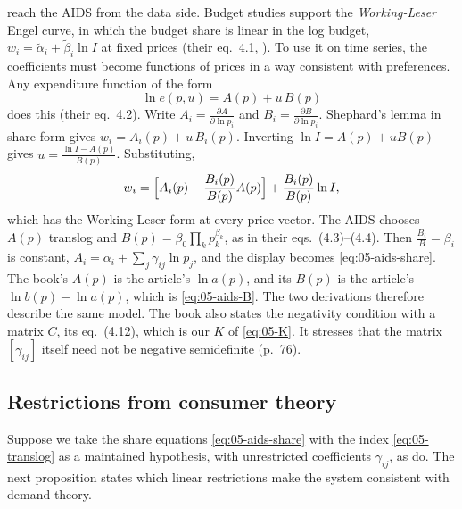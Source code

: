 \begin{remark}\label{rem:05-working-leser}
\citet[\S 3.4, pp.~75--77]{DeatonMuellbauer1980b} reach the AIDS from the data side. Budget studies
support the \emph{Working-Leser} Engel curve, in which the budget share is linear in the log budget, $w_i
= \tilde\alpha_i + \tilde\beta_i\ln I$ at fixed prices (their eq.~4.1, \citealp{Working1943,Leser1963}). To
use it on time series, the coefficients must become functions of prices in a way consistent with
preferences. Any expenditure function of the form
\begin{equation*}
  \ln e(p, u) = A(p) + u\,B(p)
\end{equation*}
does this (their eq.~4.2). Write $A_i = \frac{\partial A}{\partial\ln p_i}$ and $B_i = \frac{\partial
B}{\partial\ln p_i}$. Shephard's lemma in share form gives $w_i = A_i(p) + u\,B_i(p)$. Inverting $\ln I =
A(p) + uB(p)$ gives $u = \frac{\ln I - A(p)}{B(p)}$. Substituting,
\begin{equation*}
  w_i = \Bigl[A_i(p) - \frac{B_i(p)}{B(p)}A(p)\Bigr] + \frac{B_i(p)}{B(p)}\ln I ,
\end{equation*}
which has the Working-Leser form at every price vector. The AIDS chooses $A(p)$ translog and $B(p) =
\beta_0\prod_k p_k^{\beta_k}$, as in their eqs.~(4.3)--(4.4). Then $\frac{B_i}{B} = \beta_i$ is constant,
$A_i = \alpha_i + \sum_j\gamma_{ij}\ln p_j$, and the display becomes \eqref{eq:05-aids-share}. The book's
$A(p)$ is the article's $\ln a(p)$, and its $B(p)$ is the article's $\ln b(p) - \ln a(p)$, which is
\eqref{eq:05-aids-B}. The two derivations therefore describe the same model. The book also states the
negativity condition with a matrix $C$, its eq.~(4.12), which is our $K$ of \eqref{eq:05-K}. It stresses
that the matrix $[\gamma_{ij}]$ itself need not be negative semidefinite (p.~76).
\end{remark}

\subsection{Restrictions from consumer theory}\label{sec:05-aids-restrictions}

Suppose we take the share equations \eqref{eq:05-aids-share} with the index \eqref{eq:05-translog} as a
maintained hypothesis, with unrestricted coefficients $\gamma_{ij}$, as
\citet[p.~316]{DeatonMuellbauer1980a} do. The next proposition states which linear restrictions make the
system consistent with demand theory.

